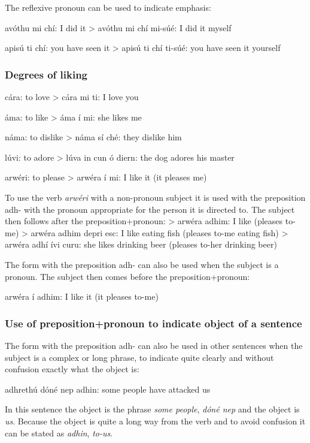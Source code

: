 The reflexive pronoun can be used to indicate emphasis:

av\'{o}thu mi ch\'{i}: I did it
> av\'{o}thu mi ch\'{i} mi-s\'{u}\'{e}: I did it myself

apis\'{u} ti ch\'{i}: you have seen it
> apis\'{u} ti ch\'{i} ti-s\'{u}\'{e}: you have seen it yourself

\subsubsection{Degrees of liking}

c\'{a}ra: to love
> c\'{a}ra mi ti: I love you

\'{a}ma: to like
> \'{a}ma \'{i} mi: she likes me

n\'{a}ma: to dislike
> n\'{a}ma s\'{i} ch\'{e}: they dislike him

l\'{u}vi: to adore
> l\'{u}va in cun \'{o} diern: the dog adores his master

arw\'{e}ri: to please
> arw\'{e}ra \'{i} mi: I like it (it pleases me)

To use the verb \textit{arw\'{e}ri} with a non-pronoun subject it is used with the preposition adh- with the pronoun appropriate for the person it is directed to. The subject then follows after the preposition+pronoun:
> arw\'{e}ra adhim: I like (pleases to-me)
> arw\'{e}ra adhim depri esc: I like eating fish (pleases to-me eating fish)
> arw\'{e}ra adh\'{i} \'{i}vi curu: she likes drinking beer (pleases to-her drinking beer)

The form with the preposition adh- can also be used when the subject is a pronoun. The subject then comes before the preposition+pronoun:

arw\'{e}ra \'{i} adhim: I like it (it pleases to-me)

\subsubsection{Use of preposition+pronoun to indicate object of a sentence}

The form with the preposition adh- can also be used in other sentences when the subject is a complex or long phrase, to indicate quite clearly and without confusion exactly what the object is:

adhreth\'{u} d\'{o}n\'{e} nep adhin: some people have attacked us

In this sentence the object is the phrase \textit{some people}, \textit{d\'{o}n\'{e} nep} and the object is \textit{us}. Because the object is quite a long way from the verb and to avoid confusion it can be stated as \textit{adhin}, \textit{to-us}.

